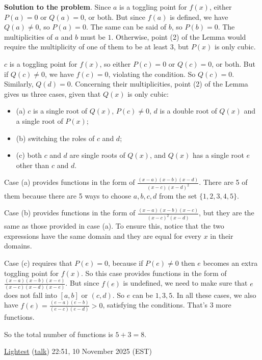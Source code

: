\begin{enumerate}
 
\textbf{Solution to the problem}. Since $a$ is a toggling point for $f(x)$, either $P(a)=0$ or $Q(a)=0$, or both. But since $f(a)$ is defined, we have $Q(a)\neq 0$, so $P(a)=0$. The same can be said of $b$, so $P(b)=0$. The multiplicities of $a$ and $b$ must be $1$. Otherwise, point (2) of the Lemma would require the multiplicity of one of them to be at least $3$, but $P(x)$ is only cubic.

 
$c$ is a toggling point for $f(x)$, so either $P(c)=0$ or $Q(c)=0$, or both. But if $Q(c)\neq 0$, we have $f(c)=0$, violating the condition. So $Q(c)=0$. Similarly, $Q(d)=0$. Concerning their multiplicities, point (2) of the Lemma gives us three cases, given that $Q(x)$ is only cubic: 

 
            \begin{itemize}
        \item (a) $c$ is a single root of $Q(x)$, $P(c)\neq 0$, $d$ is a double root of $Q(x)$ and a single root of $P(x)$;
        \item (b) switching the roles of $c$ and $d$;
        \item (c) both $c$ and $d$ are single roots of $Q(x)$, and $Q(x)$ has a single root $e$ other than $c$ and $d$.
            \end{itemize}
            
Case (a) provides functions in the form of $\frac{(x-a)(x-b)(x-d)}{(x-c)(x-d)^2}$. There are 5 of them because there are 5 ways to choose $a, b, c, d$ from the set $\{1, 2, 3, 4, 5\}$.

 Case (b) provides functions in the form of $\frac{(x-a)(x-b)(x-c)}{(x-c)^2(x-d)}$, but they are the same as those provided in case (a). To ensure this, notice that the two expressions have the same domain and they are equal for every $x$ in their domains.

 Case (c) requires that $P(e)=0$, because if $P(e)\neq 0$ then $e$ becomes an extra toggling point for $f(x)$. So this case provides functions in the form of $\frac{(x-a)(x-b)(x-e)}{(x-c)(x-d)(x-e)}$. But since $f(e)$ is undefined, we need to make sure that $e$ does not fall into $[a,b]$ or $(c,d)$. So $e$ can be $1, 3, 5$. In all these cases, we also have $f(e) = \frac{(e-a)(e-b)}{(e-c)(e-d)} > 0$, satisfying the conditions. That's 3 more functions.

 So the total number of functions is $5 + 3 = \boxed{8}$.

 \href{https://artofproblemsolving.com/wiki/index.php?title=User:Lightest}{Lightest} (\href{https://artofproblemsolving.com/wiki/index.php?title=User\_talk:Lightest&action=edit&redlink=1}{talk}) 22:51, 10 November 2025 (EST)


\end{enumerate}
